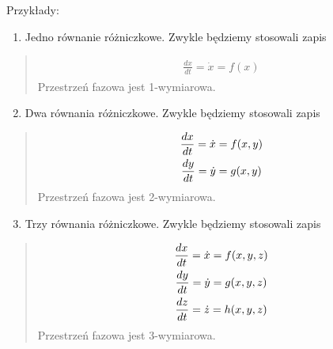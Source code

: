 \documentclass[a4paper,12pt,polish]{sphinxmanual}
\begin{document}
Przykłady:
\begin{enumerate}
\item {} 
Jedno równanie różniczkowe. Zwykle będziemy stosowali  zapis

\end{enumerate}
\begin{quote}
\label{ch1/chI021:equation-eqn25}\begin{gather}
\begin{split}\frac{dx}{dt} = \dot x = f(x)\end{split}\label{ch1/chI021-eqn25}
\end{gather}
Przestrzeń fazowa  jest 1-wymiarowa.
\end{quote}
\begin{enumerate}
\setcounter{enumi}{1}
\item {} 
Dwa równania różniczkowe. Zwykle będziemy stosowali  zapis

\end{enumerate}
\begin{quote}
\label{ch1/chI021:equation-eqn26}\begin{gather}
\begin{split}\frac{dx}{dt} = \dot x = f(x, y)\end{split}\label{ch1/chI021-eqn26}\\\begin{split}\frac{dy}{dt} = \dot y= g(x, y)\end{split}\notag
\end{gather}
Przestrzeń fazowa  jest 2-wymiarowa.
\end{quote}
\begin{enumerate}
\setcounter{enumi}{2}
\item {} 
Trzy  równania różniczkowe. Zwykle będziemy stosowali  zapis

\end{enumerate}
\begin{quote}
\label{ch1/chI021:equation-eqn28}\begin{gather}
\begin{split}\frac{dx}{dt} = \dot x = f(x, y, z)\end{split}\label{ch1/chI021-eqn28}\\\begin{split}\frac{dy}{dt} = \dot y= g(x, y, z)\end{split}\notag\\\begin{split}\frac{dz}{dt} = \dot z= h(x, y, z)\end{split}\notag
\end{gather}
Przestrzeń fazowa  jest 3-wymiarowa.
\end{quote}
\end{document}
